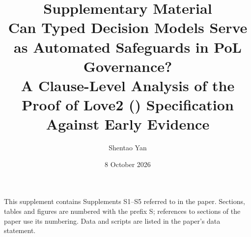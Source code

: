 \documentclass[11pt]{article}
\title{\textbf{Supplementary Material}\\[4pt]
\large Can Typed Decision Models Serve as Automated Safeguards in PoL Governance?\\ A Clause-Level Analysis of the Proof of Love2 (\pol{}) Specification Against Early Evidence}
\author{Shentao Yan}
\date{8 October 2026}
\begin{document}
\maketitle
\noindent This supplement contains Supplements S1--S5 referred to in the paper. Sections, tables and figures are numbered with the prefix S; references to sections of the paper use its numbering. Data and scripts are listed in the paper's data statement.









\end{document}
